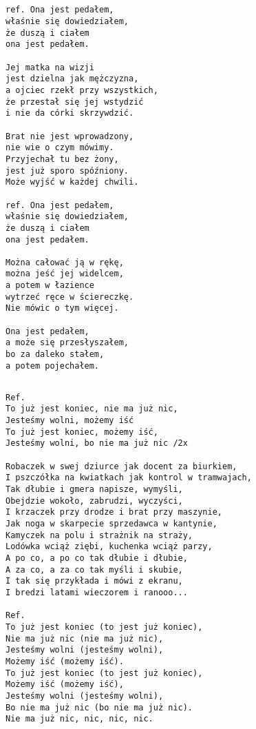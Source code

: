 \documentclass[12pt]{article}
\begin{document}
\subsection*{}
\begin{verbatim}
ref. Ona jest pedałem,
właśnie się dowiedziałem,
że duszą i ciałem
ona jest pedałem.

Jej matka na wizji
jest dzielna jak mężczyzna,
a ojciec rzekł przy wszystkich,
że przestał się jej wstydzić
i nie da córki skrzywdzić.

Brat nie jest wprowadzony,
nie wie o czym mówimy.
Przyjechał tu bez żony,
jest już sporo spóźniony.
Może wyjść w każdej chwili.

ref. Ona jest pedałem,
właśnie się dowiedziałem,
że duszą i ciałem
ona jest pedałem.

Można całować ją w rękę,
można jeść jej widelcem,
a potem w łazience
wytrzeć ręce w ściereczkę.
Nie mówic o tym więcej.

Ona jest pedałem,
a może się przesłyszałem,
bo za daleko stałem,
a potem pojechałem.
\end{verbatim}
\clearpage

\subsection*{}
\begin{verbatim}
Ref.
To już jest koniec, nie ma już nic,
Jesteśmy wolni, możemy iść
To już jest koniec, możemy iść,
Jesteśmy wolni, bo nie ma już nic /2x

Robaczek w swej dziurce jak docent za biurkiem,
I pszczółka na kwiatkach jak kontrol w tramwajach,
Tak dłubie i gmera napisze, wymyśli,
Obejdzie wokoło, zabrudzi, wyczyści,
I krzaczek przy drodze i brat przy maszynie,
Jak noga w skarpecie sprzedawca w kantynie,
Kamyczek na polu i strażnik na straży,
Lodówka wciąż ziębi, kuchenka wciąż parzy,
A po co, a po co tak dłubie i dłubie,
A za co, a za co tak myśli i skubie,
I tak się przykłada i mówi z ekranu,
I bredzi latami wieczorem i ranooo...

Ref.
To już jest koniec (to jest już koniec),
Nie ma już nic (nie ma już nic),
Jesteśmy wolni (jesteśmy wolni),
Możemy iść (możemy iść).
To już jest koniec (to jest już koniec),
Możemy iść (możemy iść),
Jesteśmy wolni (jesteśmy wolni),
Bo nie ma już nic (bo nie ma już nic).
Nie ma już nic, nic, nic, nic.
\end{verbatim}
\clearpage
\end{document}
